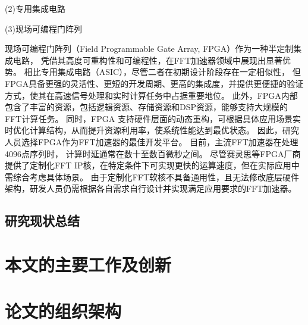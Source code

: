 (2)专用集成电路


(3)现场可编程门阵列

现场可编程门阵列（Field Programmable Gate Array, FPGA）作为一种半定制集成电路，
凭借其高度可重构性和可编程性，在FFT加速器领域中展现出显著优势。
相比专用集成电路（ASIC），尽管二者在初期设计阶段存在一定相似性，
但FPGA具备更强的灵活性、更短的开发周期、更高的集成度，并提供更便捷的验证方式，使其在高速信号处理和实时计算任务中占据重要地位。
此外，FPGA内部包含了丰富的资源，包括逻辑资源、存储资源和DSP资源，能够支持大规模的FFT计算任务。
同时，FPGA 支持硬件层面的动态重构，可根据具体应用场景实时优化计算结构，从而提升资源利用率，使系统性能达到最优状态。
因此，研究人员选择FPGA作为FFT加速器的最佳开发平台。
目前，主流FFT加速器在处理4096点序列时，
计算时延通常在数十至数百微秒之间。
尽管赛灵思等FPGA厂商提供了定制化FFT IP核，在特定条件下可实现更快的运算速度，但在实际应用中需综合考虑具体场景。
由于定制化FFT软核不具备通用性，且无法修改底层硬件架构，研发人员仍需根据各自需求自行设计并实现满足应用要求的FFT加速器。


\subsection[\hspace{-2pt}研究现状总结]{{ \hspace{-8pt}}研究现状总结}\label{section 1-2-3}

\section[\hspace{-2pt}本文的主要工作及创新]{{ \hspace{-8pt}本文的主要工作及创新}}\label{section 1-3}


\section[\hspace{-2pt}论文的组织架构]{{ \hspace{-8pt}论文的组织架构}}\label{section 1-4}


